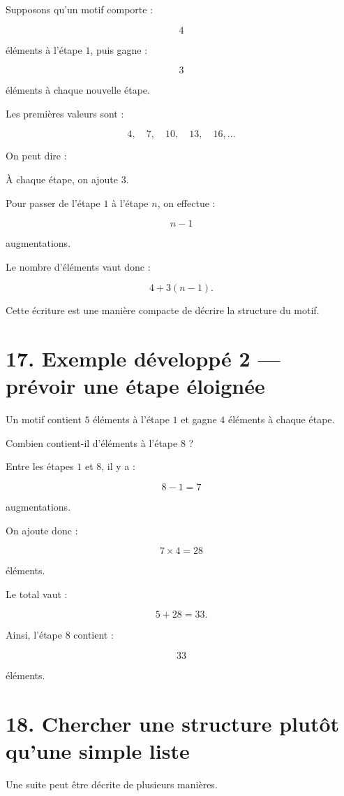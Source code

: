 Supposons qu’un motif comporte :

\[
4
\]

éléments à l’étape $1$, puis gagne :

\[
3
\]

éléments à chaque nouvelle étape.

Les premières valeurs sont :

\[
4,\quad7,\quad10,\quad13,\quad16,\ldots
\]

On peut dire :

\begin{remarque}
À chaque étape, on ajoute $3$.
\end{remarque}

Pour passer de l’étape $1$ à l’étape $n$, on effectue :

\[
n-1
\]

augmentations.

Le nombre d’éléments vaut donc :

\[
4+3(n-1).
\]

Cette écriture est une manière compacte de décrire la structure du motif.

\section{17. Exemple développé 2 — prévoir une étape éloignée}

Un motif contient $5$ éléments à l’étape $1$ et gagne $4$ éléments à chaque étape.

Combien contient-il d’éléments à l’étape $8$ ?

Entre les étapes $1$ et $8$, il y a :

\[
8-1=7
\]

augmentations.

On ajoute donc :

\[
7\times4=28
\]

éléments.

Le total vaut :

\[
5+28=33.
\]

Ainsi, l’étape $8$ contient :

\[
\boxed{33}
\]

éléments.

\section{18. Chercher une structure plutôt qu’une simple liste}

Une suite peut être décrite de plusieurs manières.

